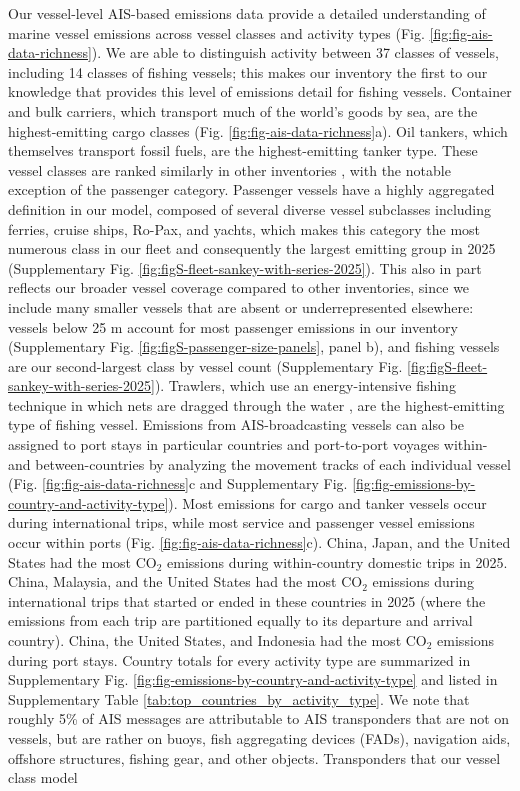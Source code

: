 \documentclass[lineno,pdflatex,sn-nature]{sn-jnl}
\begin{document}
Our vessel-level AIS-based emissions data provide a detailed understanding of marine vessel emissions across vessel classes and activity types (Fig. \ref{fig:fig-ais-data-richness}). We are able to distinguish activity between 37 classes of vessels, including 14 classes of fishing vessels; this makes our inventory the first to our knowledge that provides this level of emissions detail for fishing vessels. Container and bulk carriers, which transport much of the world's goods by sea, are the highest-emitting cargo classes (Fig. \ref{fig:fig-ais-data-richness}a). Oil tankers, which themselves transport fossil fuels, are the highest-emitting tanker type. These vessel classes are ranked similarly in other inventories \cite{johanssonGlobalAssessmentShipping2017, kramelGlobalShippingEmissions2021, yiHighresolutionGlobalShipping2025, mao2025greenhouse}, with the notable exception of the passenger category. Passenger vessels have a highly aggregated definition in our model, composed of several diverse vessel subclasses including ferries, cruise ships, Ro-Pax, and yachts, which makes this category the most numerous class in our fleet and consequently the largest emitting group in 2025 (Supplementary Fig. \ref{fig:figS-fleet-sankey-with-series-2025}). This also in part reflects our broader vessel coverage compared to other inventories, since we include many smaller vessels that are absent or underrepresented elsewhere: vessels below 25 m account for most passenger emissions in our inventory (Supplementary Fig. \ref{fig:figS-passenger-size-panels}, panel b), and fishing vessels are our second-largest class by vessel count (Supplementary Fig. \ref{fig:figS-fleet-sankey-with-series-2025}). Trawlers, which use an energy-intensive fishing technique in which nets are dragged through the water \cite{coello2015ais}, are the highest-emitting type of fishing vessel. Emissions from AIS-broadcasting vessels can also be assigned to port stays in particular countries and port-to-port voyages within- and between-countries by analyzing the movement tracks of each individual vessel (Fig. \ref{fig:fig-ais-data-richness}c and Supplementary Fig. \ref{fig:fig-emissions-by-country-and-activity-type}). Most emissions for cargo and tanker vessels occur during international trips, while most service and passenger vessel emissions occur within ports (Fig. \ref{fig:fig-ais-data-richness}c). China, Japan, and the United States had the most CO$_{2}$ emissions during within-country domestic trips in 2025. China, Malaysia, and the United States had the most CO$_{2}$ emissions during international trips that started or ended in these countries in 2025 (where the emissions from each trip are partitioned equally to its departure and arrival country). China, the United States, and Indonesia had the most CO$_{2}$ emissions during port stays. Country totals for every activity type are summarized in Supplementary Fig. \ref{fig:fig-emissions-by-country-and-activity-type} and listed in Supplementary Table \ref{tab:top_countries_by_activity_type}. We note that roughly 5\% of AIS messages are attributable to AIS transponders that are not on vessels, but are rather on buoys, fish aggregating devices (FADs), navigation aids, offshore structures, fishing gear, and other objects. Transponders that our vessel class model 
\end{document}
